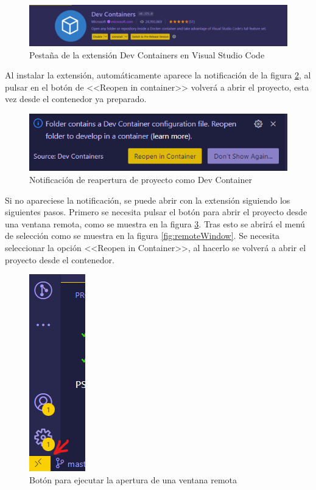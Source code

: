 \begin{figure}[!h]  
    \centering  
    \includegraphics[width=\textwidth]{img/devcontainersextension.png}  
    \caption{Pestaña de la extensión Dev Containers en Visual Studio Code}  
    \label{fig:DevContainers}
\end{figure}

Al instalar la extensión, automáticamente aparece la notificación de la figura \ref{fig:opencontainer}, al pulsar en el botón de <<Reopen in container>> volverá a abrir el proyecto, esta vez desde el contenedor ya preparado.

\begin{figure}[!h]  
    \centering  
    \includegraphics[width=\textwidth]{img/reopencontainer.png}  
    \caption{Notificación de reapertura de proyecto como Dev Container}  
    \label{fig:opencontainer}
\end{figure}

Si no apareciese la notificación, se puede abrir con la extensión siguiendo los siguientes pasos. Primero se necesita pulsar el botón para abrir el proyecto desde una ventana remota, como se muestra en la figura \ref{fig:botoncontainer}. Tras esto se abrirá el menú de selección como se muestra en la figura \ref{fig:remoteWindow}. Se necesita seleccionar la opción <<Reopen in Container>>, al hacerlo se volverá a abrir el proyecto desde el contenedor.

\begin{figure}[!h]  
    \centering  
    \includegraphics{img/botoncontainer.png}  
    \caption{Botón para ejecutar la apertura de una ventana remota}  
    \label{fig:botoncontainer}
\end{figure}

